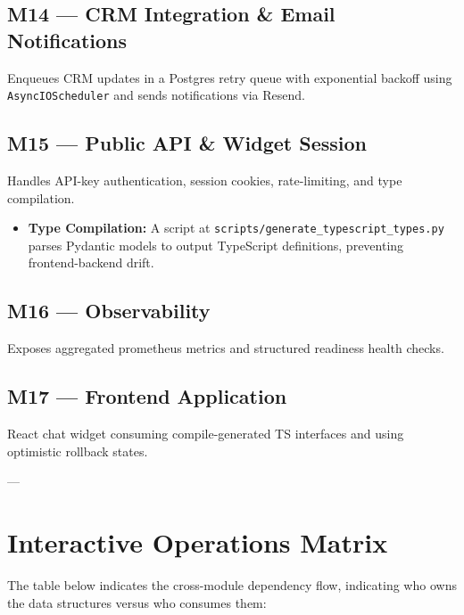 \documentclass[11pt,a4paper]{article}
\begin{document}
\subsection{M14 — CRM Integration \& Email Notifications}
Enqueues CRM updates in a Postgres retry queue with exponential backoff using \texttt{AsyncIOScheduler} and sends notifications via Resend.

\subsection{M15 — Public API \& Widget Session}
Handles API-key authentication, session cookies, rate-limiting, and type compilation.
\begin{itemize}
    \item \textbf{Type Compilation:} A script at \texttt{scripts/generate_typescript_types.py} parses Pydantic models to output TypeScript definitions, preventing frontend-backend drift.
\end{itemize}

\subsection{M16 — Observability}
Exposes aggregated prometheus metrics and structured readiness health checks.

\subsection{M17 — Frontend Application}
React chat widget consuming compile-generated TS interfaces and using optimistic rollback states.

---

\section{Interactive Operations Matrix}

The table below indicates the cross-module dependency flow, indicating who owns the data structures versus who consumes them:
\end{document}

